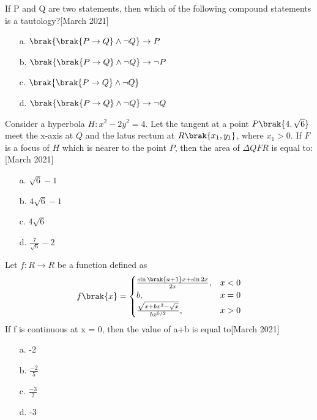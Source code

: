 	\item If P and Q are two statements, then which of the following compound statements is a tautology?\hfill [March 2021]
\begin{enumerate}
    \item [a.] $\brak{\brak{P\rightarrow Q}\land \neg Q}\rightarrow P$
    \item [b.] $\brak{\brak{P\rightarrow Q}\land \neg Q}\rightarrow \neg P$
    \item [c.] $\brak{\brak{P\rightarrow Q}\land \neg Q}$
    \item [d.] $\brak{\brak{P\rightarrow Q}\land \neg Q}\rightarrow \neg Q$
\end{enumerate}
\item  Consider a hyperbola $H : x^2 - 2y^2 = 4$. Let the tangent at a point $P \brak{4, \sqrt{6}}$ meet the x-axis at $Q$ and the latus rectum at $ R \brak{x_1, y_1}$, where  $x_1 > 0$. If $ F $ is a focus of $H$  which is nearer to the point  $P$, then the area of $\Delta QFR$ is equal to:\hfill [March 2021]
\begin{multicols}{2}
\begin{enumerate}
    \item [a.] $\sqrt{6}-1$
    \item [b.] $4\sqrt{6}-1$
	    \columnbreak
    \item [c.] $4\sqrt{6}$
    \item [d.] $\frac{7}{\sqrt{6}}-2$
\end{enumerate}
\end{multicols}
\item Let $f:R\rightarrow R$ be a function defined as 
$$f\brak{x} = \begin{cases}
    \frac{\sin\brak{a+1}x + \sin 2x}{2x}, & x<0\\
    b, & x=0\\
    \frac{\sqrt{x+bx^3-\sqrt{x}}}{bx^{5/2}}, & x>0
\end{cases}$$
If f is continuous at x = 0, then the value of a+b is equal to\hfill [March 2021]
\begin{multicols}{2}
\begin{enumerate}
    \item [a.] -2
    \item [b.] $\frac{-2}{5}$
	    \columnbreak
    \item [c.] $\frac{-3}{2}$
    \item [d.] -3
\end{enumerate}
\end{multicols}
